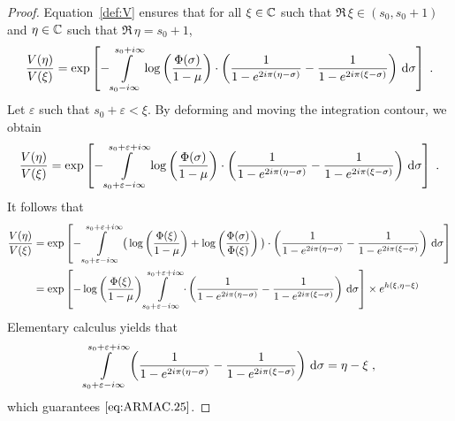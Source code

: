 \begin{proof}
    Equation~\eqref{def:V} ensures that for all $\xi \in \mathbb{C}$ such that $\Re \,\xi\in (s_0, s_0+1)$ and $\eta \in \mathbb{C}$ such that $\Re \, \eta = s_0+1$,
    \begin{align*}
        \frac{V(\eta)}{V(\xi)}
        = 
        \exp \left[
        - \int\limits_{s_0-i\infty}^{s_0+i\infty}\log \left( \frac{\Phi(\sigma)}{1-\mu}\right)
        \cdot \left(
            \frac{1}{1-e^{2i\pi(\eta-\sigma)}} - \frac{1}{1-e^{2i\pi(\xi-\sigma)}}
         \right) \,\mathrm{d} \sigma 
        \right]
        \; .
    \end{align*}
    Let $\varepsilon$ such that $s_0 + \varepsilon < \xi$. By deforming and moving the integration contour, we obtain 
    \begin{align*}
        \frac{V(\eta)}{V(\xi)}
        = 
        \exp \left[
        - \int\limits_{s_0+\varepsilon-i\infty}^{s_0+\varepsilon+i\infty}\log \left( \frac{\Phi(\sigma)}{1-\mu}\right)
        \cdot \left(
            \frac{1}{1-e^{2i\pi(\eta-\sigma)}} - \frac{1}{1-e^{2i\pi(\xi-\sigma)}}
         \right) \,\mathrm{d} \sigma 
        \right]
        \; .
    \end{align*}
    It follows that 
    \begin{align*}
        \frac{V(\eta)}{V(\xi)}
        &= 
        \exp \left[
        - \int\limits_{s_0+\varepsilon-i\infty}^{s_0+\varepsilon+i\infty}
        \big(\log \left( \frac{\Phi(\xi)}{1-\mu}\right) + 
        \log \left( \frac{\Phi(\sigma)}{\Phi(\xi)}\right)
        \big)
        \cdot 
        \left(
            \frac{1}{1-e^{2i\pi(\eta-\sigma)}} - \frac{1}{1-e^{2i\pi(\xi-\sigma)}}
         \right) \,\mathrm{d} \sigma 
        \right] \\
        &=  \exp \left[
            - \log \left( \frac{\Phi(\xi)}{1-\mu}\right)\int\limits_{s_0+\varepsilon-i\infty}^{s_0+\varepsilon+i\infty}
            \cdot 
            \left(
                \frac{1}{1-e^{2i\pi(\eta-\sigma)}} - \frac{1}{1-e^{2i\pi(\xi-\sigma)}}
             \right) \,\mathrm{d} \sigma 
            \right]
            \times
            e^{h(\xi, \eta-\xi)}
    \end{align*}
Elementary calculus yields that 
\begin{align*}
    \int\limits_{s_0+\varepsilon-i\infty}^{s_0+\varepsilon+i\infty}
            \left(
                \frac{1}{1-e^{2i\pi(\eta-\sigma)}} - \frac{1}{1-e^{2i\pi(\xi-\sigma)}}
             \right) \,\mathrm{d} \sigma 
    = 
    \eta - \xi
    \; ,
\end{align*}
which guarantees $\eqref{eq:ARMAC.25}$. 


\end{proof}
